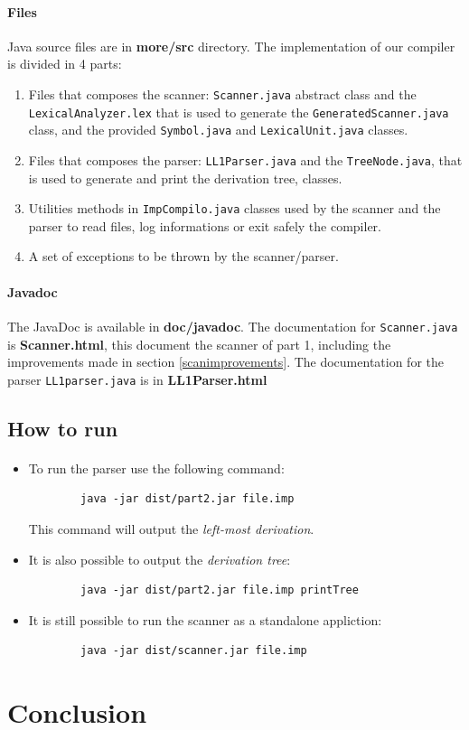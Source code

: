\documentclass[letterpaper]{article}
\begin{document}
\paragraph{Files} Java source files are in \textbf{more/src} directory.
The implementation of our compiler is divided in 4 parts:
\begin{enumerate}
    \item Files that composes the scanner: \texttt{Scanner.java} abstract
    class and the \texttt{LexicalAnalyzer.lex} that is used to generate
    the \texttt{GeneratedScanner.java} class, and
    the provided \texttt{Symbol.java} and \texttt{LexicalUnit.java} classes.
    \item Files that composes the parser: \texttt{LL1Parser.java}
    and the \texttt{TreeNode.java}, that is used to generate and print
    the derivation tree, classes.
    \item Utilities methods in \texttt{ImpCompilo.java} classes
    used by the scanner and the parser to read
    files, log informations or exit safely the compiler.
    \item A set of exceptions to be thrown by the scanner/parser.
\end{enumerate}

\paragraph{Javadoc} The JavaDoc is available in \textbf{doc/javadoc}.
The documentation for \texttt{Scanner.java} is \textbf{Scanner.html},
this document the scanner of part 1, including the improvements made
in section \ref{scanimprovements}.
The documentation for the parser
\texttt{LL1parser.java} is in
\textbf{LL1Parser.html}

\subsection{How to run}

\label{howto}

\paragraph{}

\begin{itemize}
    \item To run the parser use the following command:
    \begin{lstlisting}
        java -jar dist/part2.jar file.imp
    \end{lstlisting}
    This command will output the \textit{left-most derivation}.
    \item It is also possible to output the \textit{derivation tree}:
    \begin{lstlisting}
        java -jar dist/part2.jar file.imp printTree
    \end{lstlisting}
    \item It is still possible to run the scanner as a standalone appliction:
    \begin{lstlisting}
        java -jar dist/scanner.jar file.imp
    \end{lstlisting}
\end{itemize}


\section{Conclusion}
\end{document}
